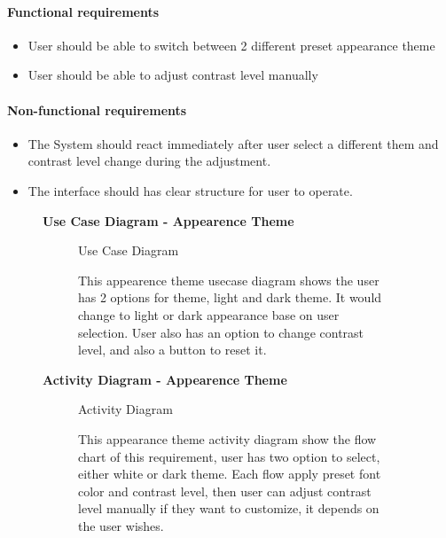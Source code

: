 \documentclass{article}
\begin{document}
		\paragraph{Functional requirements}
		\begin{itemize}
			\item User should be able to switch between 2 different preset appearance theme 
			\item User should be able to adjust contrast level manually
		\end{itemize}
		
		\paragraph{Non-functional requirements}
		\begin{itemize}
			\item The System should react immediately after user select a different them and contrast level change during the adjustment.
			\item The interface should has clear structure for user to operate.
		\end{itemize}

		\clearpage
	

	\begin{figure}[htbp]
		\textbf{Use Case Diagram - Appearence Theme }
		\centering
		\begin{subfigure}{\textwidth}
			\resizebox{\textwidth}{!}{}
			\caption{Use Case Diagram}
		\end{subfigure}
		\begin{subfigure}{\textwidth}
			This appearence theme usecase diagram shows the user has 2 options for theme, light and dark theme. It would
			change to light or dark appearance base on user selection. User also has an option to change contrast level, and also a button to reset it.
		\end{subfigure}
	\end{figure}

	\clearpage

		\begin{figure}[htbp]
			\textbf{ Activity Diagram - Appearence Theme }
			\centering
			\begin{subfigure}{\textwidth}
				\resizebox{\textwidth}{!}{}
				\caption{Activity Diagram}
			\end{subfigure}
			\begin{subfigure}{\textwidth}
				This appearance theme activity diagram show the flow chart of this requirement, user has two option to select, either white or dark theme.
				Each flow apply preset font color and contrast level, then user can adjust contrast level manually if they want to customize, it depends on the 
				user wishes.
			\end{subfigure}
		\end{figure}
		
\end{document}
